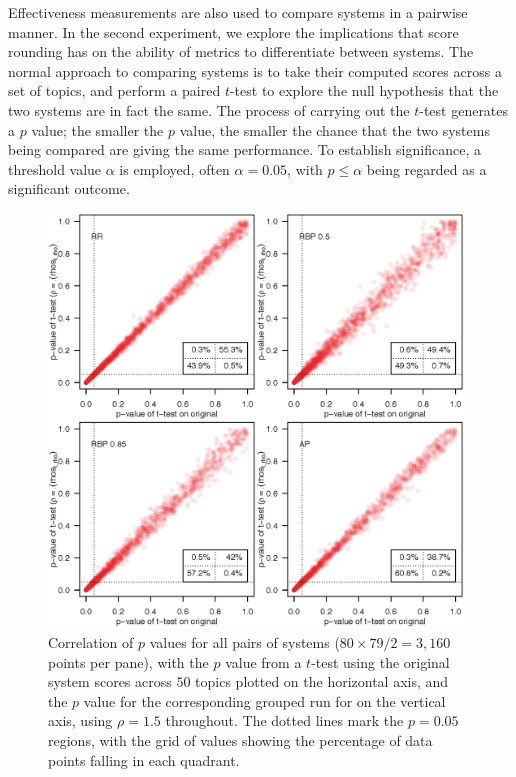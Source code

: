
Effectiveness measurements are also used to compare systems in a
pairwise manner.
In the second experiment, we explore the implications that score
rounding has on the ability of metrics to differentiate between
systems.
The normal approach to comparing systems is to take their computed
scores across a set of topics, and perform a paired $t$-test to
explore the null hypothesis that the two systems are in fact the
same.
The process of carrying out the $t$-test generates a $p$ value; the
smaller the $p$ value, the smaller the chance that the two systems
being compared are giving the same performance.
To establish significance, a threshold value $\alpha$ is employed,
often $\alpha=0.05$, with $p\le\alpha$ being regarded as a
significant outcome.

\begin{figure}[t!]
\centering
\includegraphics[width=0.98\textwidth]{tmp-fig-03.png}
\caption{Correlation of $p$ values for all pairs of systems
($80\times79/2=3{,}160$ points per pane), with the $p$ value from a
$t$-test using the original system scores across $50$ topics plotted
on the horizontal axis, and the $p$ value for the corresponding
grouped run for on the vertical axis, using $\rho=1.5$ throughout.
The dotted lines mark the $p=0.05$ regions, with the grid of values
showing the percentage of data points falling in each quadrant.
\label{fig-pair-variation}}
\end{figure}

